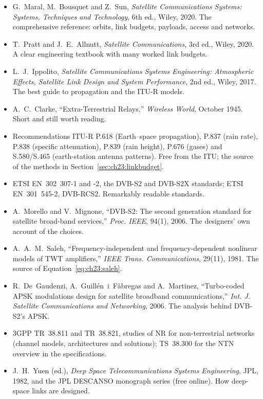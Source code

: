 \furtherreading
{}
\begin{itemize}
\item G.~Maral, M.~Bousquet and Z.~Sun, \emph{Satellite Communications Systems: Systems, Techniques
and Technology}, 6th ed., Wiley, 2020. The comprehensive reference: orbits, link budgets, payloads,
access and networks.
\item T.~Pratt and J.~E.~Allnutt, \emph{Satellite Communications}, 3rd ed., Wiley, 2020. A clear
engineering textbook with many worked link budgets.
\item L.~J.~Ippolito, \emph{Satellite Communications Systems Engineering: Atmospheric Effects,
Satellite Link Design and System Performance}, 2nd ed., Wiley, 2017. The best guide to propagation
and the ITU-R models.
\item A.~C.~Clarke, ``Extra-Terrestrial Relays,'' \emph{Wireless World}, October 1945. Short and still
worth reading.
\item Recommendations ITU-R P.618 (Earth--space propagation), P.837 (rain rate), P.838 (specific
attenuation), P.839 (rain height), P.676 (gases) and S.580/S.465 (earth-station antenna patterns).
Free from the ITU; the source of the methods in Section~\ref{sec:ch23:linkbudget}.
\item ETSI EN~302~307-1 and -2, the DVB-S2 and DVB-S2X standards; ETSI EN~301~545-2, DVB-RCS2.
Remarkably readable standards.
\item A.~Morello and V.~Mignone, ``DVB-S2: The second generation standard for satellite broad-band
services,'' \emph{Proc. IEEE}, 94(1), 2006. The designers' own account of the choices.
\item A.~A.~M.~Saleh, ``Frequency-independent and frequency-dependent nonlinear models of TWT
amplifiers,'' \emph{IEEE Trans. Communications}, 29(11), 1981. The source of Equation~\eqref{eq:ch23:saleh}.
\item R.~De~Gaudenzi, A.~Guill\'en~i~F\`abregas and A.~Martinez, ``Turbo-coded APSK modulations design
for satellite broadband communications,'' \emph{Int. J. Satellite Communications and Networking},
2006. The analysis behind DVB-S2's APSK.
\item 3GPP TR~38.811 and TR~38.821, studies of NR for non-terrestrial networks (channel models,
architectures and solutions); TS~38.300 for the NTN overview in the specifications.
\item J.~H.~Yuen (ed.), \emph{Deep Space Telecommunications Systems Engineering}, JPL, 1982, and the
JPL DESCANSO monograph series (free online). How deep-space links are designed.
\end{itemize}
